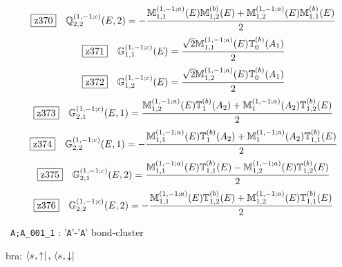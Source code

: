 \documentclass[fleqn,10pt,landscape]{jsarticle}
\begin{document}
\begin{dmath*}
\hspace*{3mm}\fbox{z370}\quad \mathbb{Q}_{2,2}^{(1,-1;c)}(E,2)=- \frac{\mathbb{M}_{1,1}^{(1,-1;a)}(E) \mathbb{M}_{1,2}^{(b)}(E) + \mathbb{M}_{1,2}^{(1,-1;a)}(E) \mathbb{M}_{1,1}^{(b)}(E)}{2}
\end{dmath*}
\begin{dmath*}
\hspace*{3mm}\fbox{z371}\quad \mathbb{G}_{1,1}^{(1,-1;c)}(E)=\frac{\sqrt{2} \mathbb{M}_{1,1}^{(1,-1;a)}(E) \mathbb{T}_{0}^{(b)}(A_{1})}{2}
\end{dmath*}
\begin{dmath*}
\hspace*{3mm}\fbox{z372}\quad \mathbb{G}_{1,2}^{(1,-1;c)}(E)=\frac{\sqrt{2} \mathbb{M}_{1,2}^{(1,-1;a)}(E) \mathbb{T}_{0}^{(b)}(A_{1})}{2}
\end{dmath*}
\begin{dmath*}
\hspace*{3mm}\fbox{z373}\quad \mathbb{G}_{2,1}^{(1,-1;c)}(E,1)=\frac{\mathbb{M}_{1,2}^{(1,-1;a)}(E) \mathbb{T}_{1}^{(b)}(A_{2}) + \mathbb{M}_{1}^{(1,-1;a)}(A_{2}) \mathbb{T}_{1,2}^{(b)}(E)}{2}
\end{dmath*}
\begin{dmath*}
\hspace*{3mm}\fbox{z374}\quad \mathbb{G}_{2,2}^{(1,-1;c)}(E,1)=- \frac{\mathbb{M}_{1,1}^{(1,-1;a)}(E) \mathbb{T}_{1}^{(b)}(A_{2}) + \mathbb{M}_{1}^{(1,-1;a)}(A_{2}) \mathbb{T}_{1,1}^{(b)}(E)}{2}
\end{dmath*}
\begin{dmath*}
\hspace*{3mm}\fbox{z375}\quad \mathbb{G}_{2,1}^{(1,-1;c)}(E,2)=\frac{\mathbb{M}_{1,1}^{(1,-1;a)}(E) \mathbb{T}_{1,1}^{(b)}(E) - \mathbb{M}_{1,2}^{(1,-1;a)}(E) \mathbb{T}_{1,2}^{(b)}(E)}{2}
\end{dmath*}
\begin{dmath*}
\hspace*{3mm}\fbox{z376}\quad \mathbb{G}_{2,2}^{(1,-1;c)}(E,2)=- \frac{\mathbb{M}_{1,1}^{(1,-1;a)}(E) \mathbb{T}_{1,2}^{(b)}(E) + \mathbb{M}_{1,2}^{(1,-1;a)}(E) \mathbb{T}_{1,1}^{(b)}(E)}{2}
\end{dmath*}
\vspace{5mm}

\noindent\textbullet\, \texttt{A;A_001_1} : '\texttt{A}'-'\texttt{A}' bond-cluster

\noindent\quad * bra: $\bra{s_{},\uparrow},\, \bra{s_{},\downarrow}$
\end{document}
